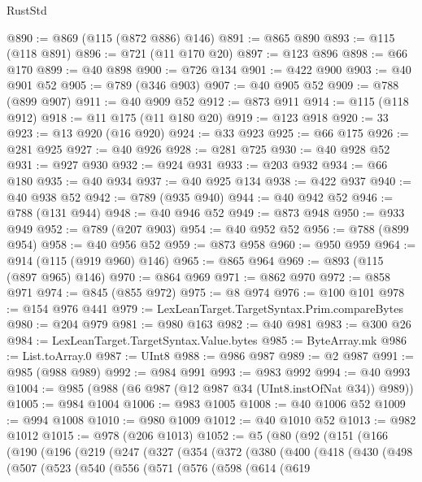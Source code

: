 \begin{lexlean}{RustStd}
\begin{coremodule}
{\begin{coremodule}
{{{{{{{{{{{{{{{{{{{{{{{{{{{{{{{{{{{{{{@890 := @869 (@115 (@872 @886) @146)
@891 := @865 @890
@893 := @115 (@118 @891)
@896 := @721 (@11 @170 @20)
@897 := @123 @896
@898 := @66 @170
@899 := @40 @898
@900 := @726 @134
@901 := @422 @900
@903 := @40 @901 @52
@905 := @789 (@346 @903)
@907 := @40 @905 @52
@909 := @788 (@899 @907)
@911 := @40 @909 @52
@912 := @873 @911
@914 := @115 (@118 @912)
@918 := @11 @175 (@11 @180 @20)
@919 := @123 @918
@920 := 33
@923 := @13 @920 (@16 @920)
@924 := @33 @923
@925 := @66 @175
@926 := @281 @925
@927 := @40 @926
@928 := @281 @725
@930 := @40 @928 @52
@931 := @927 @930
@932 := @924 @931
@933 := @203 @932
@934 := @66 @180
@935 := @40 @934
@937 := @40 @925 @134
@938 := @422 @937
@940 := @40 @938 @52
@942 := @789 (@935 @940)
@944 := @40 @942 @52
@946 := @788 (@131 @944)
@948 := @40 @946 @52
@949 := @873 @948
@950 := @933 @949
@952 := @789 (@207 @903)
@954 := @40 @952 @52
@956 := @788 (@899 @954)
@958 := @40 @956 @52
@959 := @873 @958
@960 := @950 @959
@964 := @914 (@115 (@919 @960) @146)
@965 := @865 @964
@969 := @893 (@115 (@897 @965) @146)
@970 := @864 @969
@971 := @862 @970
@972 := @858 @971
@974 := @845 (@855 @972)
@975 := @8 @974
@976 := @100 @101
@978 := @154 @976 @441
@979 := LexLeanTarget.TargetSyntax.Prim.compareBytes
@980 := @204 @979
@981 := @980 @163
@982 := @40 @981
@983 := @300 @26
@984 := LexLeanTarget.TargetSyntax.Value.bytes
@985 := ByteArray.mk
@986 := List.toArray.{0}
@987 := UInt8
@988 := @986 @987
@989 := @2 @987
@991 := @985 (@988 @989)
@992 := @984 @991
@993 := @983 @992
@994 := @40 @993
@1004 := @985 (@988 (@6 @987 (@12 @987 @34 (UInt8.instOfNat @34)) @989))
@1005 := @984 @1004
@1006 := @983 @1005
@1008 := @40 @1006 @52
@1009 := @994 @1008
@1010 := @980 @1009
@1012 := @40 @1010 @52
@1013 := @982 @1012
@1015 := @978 (@206 @1013)
@1052 := @5
    (@80
      (@92
        (@151
          (@166
            (@190
              (@196
                (@219
                  (@247
                    (@327
                      (@354
                        (@372
                          (@380
                            (@400
                              (@418
                                (@430
                                  (@498
                                    (@507
                                      (@523
                                        (@540
                                          (@556
                                            (@571
                                              (@576
                                                (@598
                                                  (@614
                                                    (@619
}}}}}}}}}}}}}}}}}}}}}}}}}}}}}}}}}}}}}}
\end{coremodule}}
\end{coremodule}
\end{lexlean}
